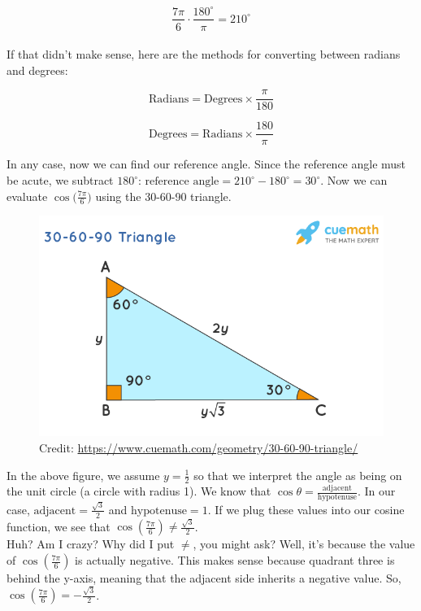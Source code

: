 \documentclass[12pt]{article}
\begin{document}
\[\frac{7\pi}{6}\cdot\frac{180^{\circ}}{\pi}=210^{\circ}\]\\

If that didn't make sense, here are the methods for converting between radians and degrees:

\[ \text{Radians} = \text{Degrees} \times \frac{\pi}{180} \]

\[ \text{Degrees} = \text{Radians} \times \frac{180}{\pi} \]

In any case, now we can find our reference angle. Since the reference angle must be acute, we subtract \(180^{\circ}\): \(\text{reference angle}=210^{\circ}-180^{\circ}=30^{\circ}\). Now we can evaluate \(\cos({\frac{7\pi}{6})}\) using the 30-60-90 triangle.\\ 
\begin{figure}[ht]
	\centering
	\includegraphics[scale=0.5]{30-60-90-triangle-1621153010}
	\caption{Credit: \url{https://www.cuemath.com/geometry/30-60-90-triangle/}}
\end{figure}

In the above figure, we assume \( y=\frac{1}{2} \) so that we interpret the angle as being on the unit circle (a circle with radius 1). We know that \(\cos \theta = \frac{\text{adjacent}}{\text{hypotenuse}}\). In our case, \(\text{adjacent} = \frac{\sqrt{3}}{2}\) and \(\text{hypotenuse} = 1\). If we plug these values into our cosine function, we see that \(\cos\left(\frac{7\pi}{6}\right) \neq \frac{\sqrt{3}}{2}\). \\

Huh? Am I crazy? Why did I put \(\neq\), you might ask? Well, it's because the value of \(\cos\left(\frac{7\pi}{6}\right)\) is actually negative. This makes sense because quadrant three is behind the y-axis, meaning that the adjacent side inherits a negative value. So, \(\cos\left(\frac{7\pi}{6}\right) = -\frac{\sqrt{3}}{2}\).\\
\end{document}
